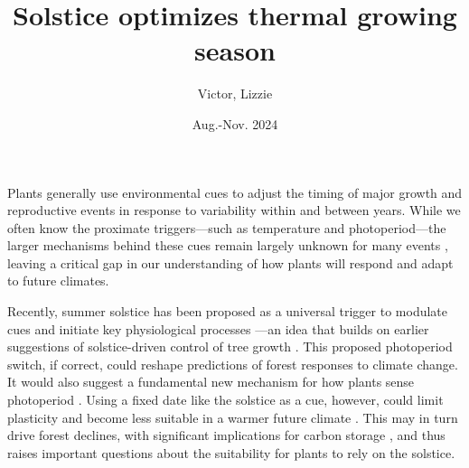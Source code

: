 \documentclass[11pt,letter]{article}
\title{Solstice optimizes thermal growing season}
\author{Victor, Lizzie}
\date{Aug.-Nov. 2024}
\begin{document}
\maketitle


Plants generally use environmental cues to adjust the timing of major growth and reproductive events in response to variability within and between years. While we often know the proximate triggers---such as temperature and photoperiod---the larger mechanisms behind these cues remain largely unknown for many events \citep{Chuine2017}, leaving a critical gap in our understanding of how plants will respond and adapt to future climates.

Recently, summer solstice has been proposed as a universal trigger to modulate cues and initiate key physiological processes \citep{Zohner2023, Journe2024}---an idea that builds on earlier suggestions of solstice-driven control of tree growth \citep{Rossi2006}. This proposed photoperiod switch, if correct, could reshape predictions of forest responses to climate change. It would also suggest a fundamental new mechanism for how plants sense photoperiod \citep{Gendron2023}. 
Using a fixed date like the solstice as a cue, however, could limit plasticity and become less suitable in a warmer future climate \citep{Bonamour2019}. 
This may in turn drive forest declines, with significant implications for carbon storage \citep{green2022limits}, and thus raises important questions about the suitability for plants to rely on the solstice. 
\end{document}
